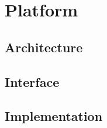 \chapter{Platform}
\label{chap:platform}

\section{Architecture}

\section{Interface}

\section{Implementation}
